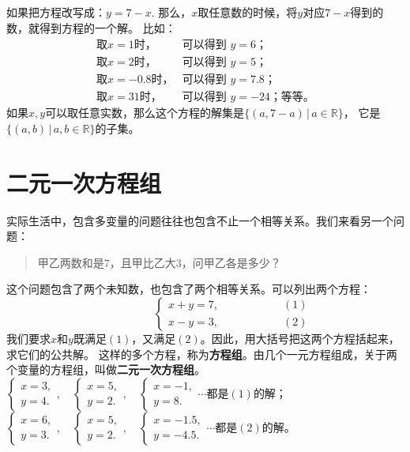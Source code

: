 \documentclass[12pt,UTF8,fontset=none]{ctexbook}
\begin{document}
如果把方程改写成：$ y = 7 - x.$
那么，$x$取任意数的时候，将$y$对应$7 - x$得到的数，就得到方程的一个解。
比如：
$$
\begin{array}{ll}
    \mbox{取}x = 1\mbox{时，} & \mbox{可以得到 }y = 6\mbox{；} \\
    \mbox{取}x = 2\mbox{时，} & \mbox{可以得到 }y = 5\mbox{；}  \\
    \mbox{取}x = -0.8\mbox{时，} & \mbox{可以得到 }y = 7.8\mbox{；}  \\
    \mbox{取}x = 31\mbox{时，} & \mbox{可以得到 }y = -24\mbox{；等等。} 
\end{array}
$$
如果$x,y$可以取任意实数，那么这个方程的解集是$\{(a, 7-a) \,|\, a \in \mathbb{R}\}$，
它是$\{(a, b) \,|\, a,b\in\mathbb{R}\}$的子集。

\section{二元一次方程组}
实际生活中，包含多变量的问题往往也包含不止一个相等关系。我们来看另一个问题：
\begin{quote}
    甲乙两数和是$7$，且甲比乙大$3$，问甲乙各是多少？
\end{quote}
这个问题包含了两个未知数，也包含了两个相等关系。可以列出两个方程：
$$ \quad \quad \quad \quad \quad\left\{
\begin{array}{cr}
     x + y = 7, & \quad \quad \quad \quad \quad (1) \\
     x - y = 3, & \quad \quad \quad \quad \quad (2)
\end{array}\right.
$$
我们要求$x$和$y$既满足$(1)$，又满足$(2)$。因此，用大括号把这两个方程括起来，求它们的公共解。
这样的多个方程，称为\textbf{方程组}。由几个一元方程组成，关于两个变量的方程组，叫做\textbf{二元一次方程组}。\\
$ \left\{ \begin{array}{c}
    x = 3, \\
    y = 4.
\end{array}\right. ,\quad \left\{ \begin{array}{c}
    x = 5, \\
    y = 2.
\end{array}\right. ,\quad \left\{ \begin{array}{c}
    x = -1, \\
    y = 8.
\end{array}\right.\cdots $都是$(1)$的解；\\
$ \left\{ \begin{array}{c}
    x = 6, \\
    y = 3.
\end{array}\right. ,\quad \left\{ \begin{array}{c}
    x = 5, \\
    y = 2.
\end{array}\right. ,\quad \left\{ \begin{array}{c}
    x = -1.5, \\
    y = -4.5.
\end{array}\right.\cdots $都是$(2)$的解。\\
\end{document}
